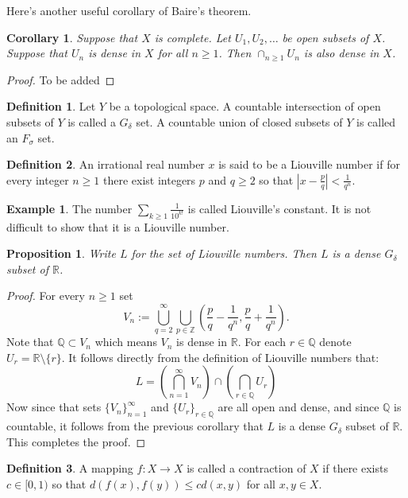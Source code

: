 \documentclass[11pt,a4paper]{article}
\theoremstyle{definition}
\newtheorem{definition}{Definition}[section]
\newtheorem{example}{Example}[section]
\theoremstyle{plain}
\newtheorem{proposition}[theorem]{Proposition}
\newtheorem{corollary}[theorem]{Corollary}
\newcommand{\Z}{\mathbb{Z}}
\newcommand{\Q}{\mathbb{Q}}
\newcommand{\R}{\mathbb{R}}
\newcommand{\abs}[1]{\left\lvert #1\right\rvert}
\begin{document}
	Here's another useful corollary of Baire's theorem.
	\begin{corollary}
		Suppose that $X$ is complete. Let $U_1,U_2,\dots$ be open subsets of $X$.
		Suppose that $U_n$ is dense in $X$ for all $n \geq 1$. Then 
		$\cap_{n \geq 1}{U_n}$ is also dense in $X$.
	\end{corollary}
	\begin{proof}
		To be added
	\end{proof}
	\begin{definition}
		Let $Y$ be a topological space. A countable intersection of open
		subsets of $Y$ is called a $G_\delta$ set. A countable union of closed 		
		subsets of $Y$ is called an $F_\sigma$ set.
	\end{definition}
	\begin{definition}
		An irrational real number $x$ is said to be a Liouville number if
		for every integer $n \geq 1$ there exist integers $p$ and $q \geq 2$ 
		so that $\abs{x - \frac{p}{q}} < \frac{1}{q^n}$.
	\end{definition}
	\begin{example}
		The number $\sum_{k \geq 1}{\frac{1}{10^{k!}}}$ is called Liouville’s 
		constant. It is not difficult to show that it is a Liouville number.
	\end{example}
	\begin{proposition}
		Write $L$ for the set of Liouville numbers. Then $L$ is a dense
		$G_\delta$ subset of $\R$.
	\end{proposition}
	\begin{proof}
		For every $n \geq 1$ set
		\[
			V_n := \bigcup_{q=2}^{\infty} \bigcup_{p \in \Z}
			\left(\frac{p}{q} - \frac{1}{q^n},\frac{p}{q} + \frac{1}{q^n}\right).
		\]
		Note that $\Q \subset V_n$ which means $V_n$ is dense in $\R$. For each
		$r \in \Q$ denote $U_r = \R \setminus \{r\}$. It follows directly from
		the definition of Liouville numbers that:
		\[
			L = \left(\bigcap_{n=1}^{\infty}{V_n}\right) \cap
				\left(\bigcap_{r \in \Q}{U_r}\right)
		\]
		Now since that sets $\{V_n\}_{n=1}^{\infty}$ and $\{U_r\}_{r \in \Q}$
		are all open and dense, and since $\Q$ is countable, it follows from
		the previous corollary that $L$ is a dense $G_\delta$ subset of $\R$.
		This completes the proof.
	\end{proof}
	\begin{definition}
		A mapping $f \colon X \to X$ is called a contraction of $X$ if there 
		exists $c \in [0, 1)$ so that $d(f(x),f(y)) \le cd(x,y)$ for all 
		$x,y \in X$.
	\end{definition}
\end{document}
